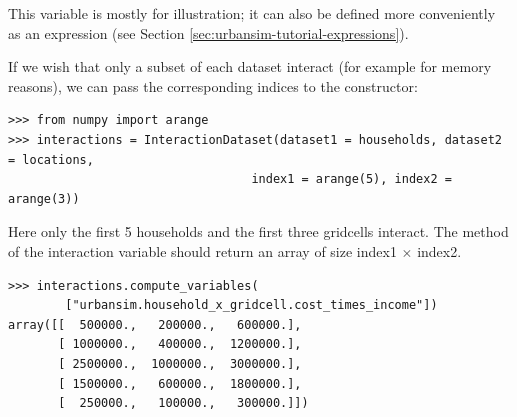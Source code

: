 This  variable is mostly for illustration; it can
also be defined more conveniently as an expression (see Section
\ref{sec:urbansim-tutorial-expressions}).

If we wish that only a subset of each dataset \datasetindex interact (for example for
memory reasons), we can pass the corresponding indices to the constructor:
\begin{verbatim}
>>> from numpy import arange
>>> interactions = InteractionDataset(dataset1 = households, dataset2 = locations,
                                  index1 = arange(5), index2 = arange(3))
\end{verbatim}
Here only the first 5 households and the first three gridcells interact.
The  method of the interaction variable \variablesindex should return an array of
size index1 $\times$ index2.

\variablesindex \attributesindex
\begin{verbatim}
>>> interactions.compute_variables(
        ["urbansim.household_x_gridcell.cost_times_income"])
array([[  500000.,   200000.,   600000.],
       [ 1000000.,   400000.,  1200000.],
       [ 2500000.,  1000000.,  3000000.],
       [ 1500000.,   600000.,  1800000.],
       [  250000.,   100000.,   300000.]])
\end{verbatim}
\label{page:compute-interaction}

